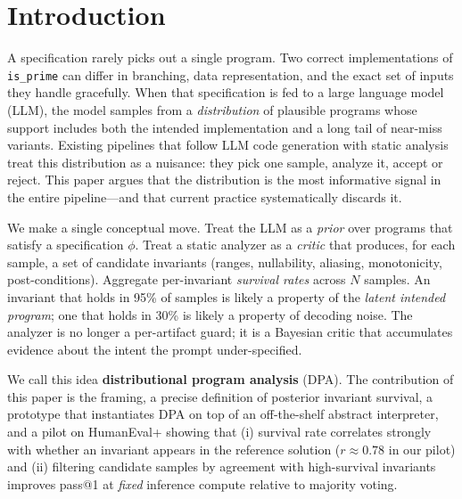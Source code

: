 \documentclass[sigconf,review,anonymous,nonacm]{acmart}
\begin{document}

\maketitle

\section{Introduction}
\label{sec:intro}

A specification rarely picks out a single program. Two correct
implementations of \texttt{is\_prime} can differ in branching, data
representation, and the exact set of inputs they handle gracefully. When
that specification is fed to a large language model (LLM), the model
samples from a \emph{distribution} of plausible programs whose support
includes both the intended implementation and a long tail of
near-miss variants. Existing pipelines that follow LLM code generation
with static analysis treat this distribution as a nuisance: they pick
one sample, analyze it, accept or reject. This paper argues that the
distribution is the most informative signal in the entire pipeline---and
that current practice systematically discards it.

We make a single conceptual move. Treat the LLM as a \emph{prior} over
programs that satisfy a specification $\phi$. Treat a static analyzer as
a \emph{critic} that produces, for each sample, a set of candidate
invariants (ranges, nullability, aliasing, monotonicity, post-conditions).
Aggregate per-invariant \emph{survival rates} across $N$ samples. An
invariant that holds in 95\% of samples is likely a property of the
\emph{latent intended program}; one that holds in 30\% is likely a
property of decoding noise. The analyzer is no longer a per-artifact
guard; it is a Bayesian critic that accumulates evidence about the
intent the prompt under-specified.

We call this idea \textbf{distributional program analysis} (DPA). The
contribution of this paper is the framing, a precise definition of
posterior invariant survival, a prototype that instantiates DPA on top
of an off-the-shelf abstract interpreter, and a pilot on HumanEval+
\cite{liu2023humanevalplus} showing that (i) survival rate correlates
strongly with whether an invariant appears in the reference solution
($r \approx 0.78$ in our pilot) and (ii) filtering candidate samples by
agreement with high-survival invariants improves pass@1 at \emph{fixed}
inference compute relative to majority voting.
\end{document}
